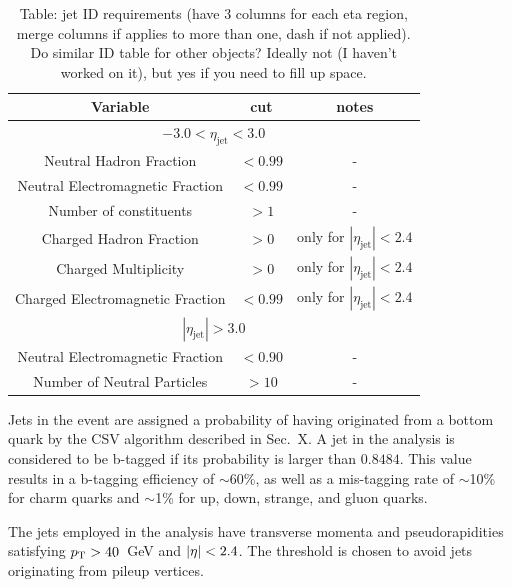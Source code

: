 
\begin{table}[ht!]
\caption{Table: jet ID requirements (have 3 columns for each eta region, merge 
columns if applies to more than one, dash if not applied).
Do similar ID table for other objects? Ideally not (I haven't worked on it), 
but yes if you need to fill up space.}
\label{tab:jet-id}
\centering
\begin{tabular}{ ccc }
Variable & cut & notes \\ \hline
\multicolumn{3}{c}{$-3.0 < \eta_{\mathrm{jet}} < 3.0$} \\ \hline    
Neutral Hadron Fraction & $<0.99$ & - \\
Neutral Electromagnetic Fraction & $<0.99$ & - \\
Number of constituents & $>1$ & - \\
Charged Hadron Fraction & $>0$ & only for $|\eta_{\mathrm{jet}}| < 2.4$ \\
Charged Multiplicity & $>0$ & only for $|\eta_{\mathrm{jet}}| < 2.4$ \\
Charged Electromagnetic Fraction & $<0.99$ & only for $|\eta_{\mathrm{jet}}| < 
2.4$ \\ \hline
\multicolumn{3}{c}{$|\eta_{\mathrm{jet}}| > 3.0$} \\ \hline        
Neutral Electromagnetic Fraction & $<0.90$ & - \\
Number of Neutral Particles & $>10$ & - \\
\end{tabular}
\end{table}

Jets in the event are assigned a probability of having originated from a bottom 
quark by the CSV algorithm described in Sec.~X. A jet in the analysis is 
considered to be b-tagged if its probability is larger than $0.8484$. This 
value 
results in a b-tagging efficiency of $\sim$60\%, as well as a mis-tagging rate 
of $\sim$10\% for charm quarks and $\sim$1\% for up, down, strange, and gluon 
quarks.

The jets employed in the analysis have transverse momenta and pseudorapidities 
satisfying ${p_{\text T}}>40$~GeV and $|\eta|<2.4$. The \pt threshold is chosen to avoid 
jets originating from pileup vertices.

